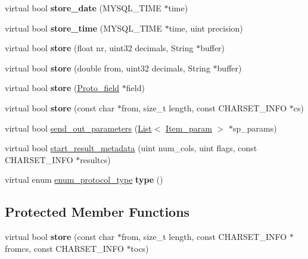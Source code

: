 \begin{DoxyCompactItemize}
virtual bool {\bfseries store\+\_\+date} (M\+Y\+S\+Q\+L\+\_\+\+T\+I\+ME $\ast$time)
\item 
\mbox{\label{classProtocol__binary_aadbe037660a5ed72ab94e6cbe084432e}} 
virtual bool {\bfseries store\+\_\+time} (M\+Y\+S\+Q\+L\+\_\+\+T\+I\+ME $\ast$time, uint precision)
\item 
\mbox{\label{classProtocol__binary_a67fab423360cc7068d5b4a5393f7fd58}} 
virtual bool {\bfseries store} (float nr, uint32 decimals, String $\ast$buffer)
\item 
\mbox{\label{classProtocol__binary_afee6cd03bbf478aa556ed2d4c5ae885b}} 
virtual bool {\bfseries store} (double from, uint32 decimals, String $\ast$buffer)
\item 
\mbox{\label{classProtocol__binary_a35bbe3978ae4aa2551ceb7822006d387}} 
virtual bool {\bfseries store} (\mbox{\hyperlink{classProto__field}{Proto\+\_\+field}} $\ast$field)
\item 
\mbox{\label{classProtocol__binary_aac3f28db7ab13966e071664f50eb36dc}} 
virtual bool {\bfseries store} (const char $\ast$from, size\+\_\+t length, const C\+H\+A\+R\+S\+E\+T\+\_\+\+I\+N\+FO $\ast$cs)
\item 
virtual bool \mbox{\hyperlink{classProtocol__binary_a912d03865e662d1568ae766a6371a3b1}{send\+\_\+out\+\_\+parameters}} (\mbox{\hyperlink{classList}{List}}$<$ \mbox{\hyperlink{classItem__param}{Item\+\_\+param}} $>$ $\ast$sp\+\_\+params)
\item 
virtual bool \mbox{\hyperlink{classProtocol__binary_a2edc9bbded2ebdb50ccdcce29630d5f5}{start\+\_\+result\+\_\+metadata}} (uint num\+\_\+cols, uint flags, const C\+H\+A\+R\+S\+E\+T\+\_\+\+I\+N\+FO $\ast$resultcs)
\item 
\mbox{\label{classProtocol__binary_a5bcead57d2de0b58880e66393775270b}} 
virtual enum \mbox{\hyperlink{classProtocol_ab1d147a8122f4ea4f8516ee23c514b02}{enum\+\_\+protocol\+\_\+type}} {\bfseries type} ()
\end{DoxyCompactItemize}
\subsection*{Protected Member Functions}
\begin{DoxyCompactItemize}
\item 
\mbox{\label{classProtocol__binary_a5d6a3da148d135f1531b8d2bb3183255}} 
virtual bool {\bfseries store} (const char $\ast$from, size\+\_\+t length, const C\+H\+A\+R\+S\+E\+T\+\_\+\+I\+N\+FO $\ast$fromcs, const C\+H\+A\+R\+S\+E\+T\+\_\+\+I\+N\+FO $\ast$tocs)
\end{DoxyCompactItemize}
